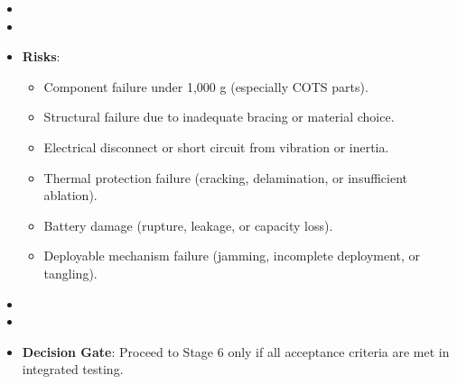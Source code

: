 \begin{itemize}
\begin{enumerate}
            \item Battery performance: Capacity retention $> 80\%$ post-acceleration.
            \item Deployable function: Antennas and solar panels deploy correctly and operate post-acceleration.
            \item Avionics functionality: No data corruption or latent faults; IMU and GPS provide valid data post-acceleration.
        \end{enumerate}
    \item \item \item \textbf{Risks}:
        \begin{itemize}
            \item Component failure under 1,000 g (especially COTS parts).
            \item Structural failure due to inadequate bracing or material choice.
            \item Electrical disconnect or short circuit from vibration or inertia.
            \item Thermal protection failure (cracking, delamination, or insufficient ablation).
            \item Battery damage (rupture, leakage, or capacity loss).
            \item Deployable mechanism failure (jamming, incomplete deployment, or tangling).
        \end{itemize}
    \item \item \item \textbf{Decision Gate}: Proceed to Stage 6 only if all acceptance criteria are met in integrated testing.
\end{itemize}

